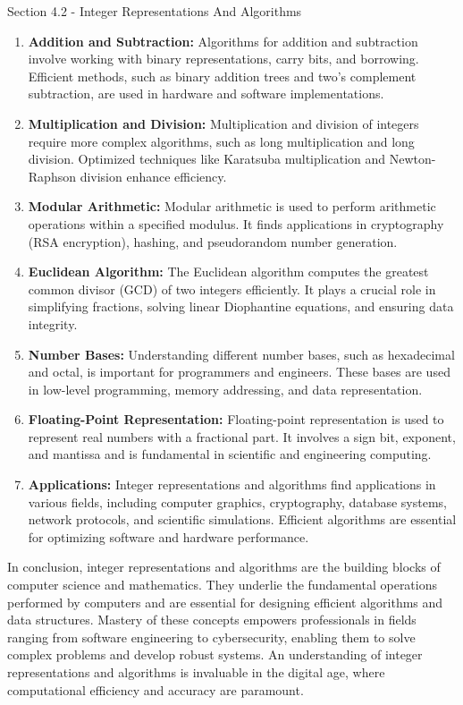 \begin{notes}{Section 4.2 - Integer Representations And Algorithms}
\begin{enumerate}[label=\arabic*.]
        \item \textbf{Addition and Subtraction:} Algorithms for addition and subtraction involve working with binary representations, carry bits, and borrowing. Efficient methods, such as binary addition 
        trees and two's complement subtraction, are used in hardware and software implementations.
        
        \item \textbf{Multiplication and Division:} Multiplication and division of integers require more complex algorithms, such as long multiplication and long division. Optimized techniques like 
        Karatsuba multiplication and Newton-Raphson division enhance efficiency.
        
        \item \textbf{Modular Arithmetic:} Modular arithmetic is used to perform arithmetic operations within a specified modulus. It finds applications in cryptography (RSA encryption), hashing, and 
        pseudorandom number generation.
        
        \item \textbf{Euclidean Algorithm:} The Euclidean algorithm computes the greatest common divisor (GCD) of two integers efficiently. It plays a crucial role in simplifying fractions, solving linear 
        Diophantine equations, and ensuring data integrity.
        
        \item \textbf{Number Bases:} Understanding different number bases, such as hexadecimal and octal, is important for programmers and engineers. These bases are used in low-level programming, memory 
        addressing, and data representation.
        
        \item \textbf{Floating-Point Representation:} Floating-point representation is used to represent real numbers with a fractional part. It involves a sign bit, exponent, and mantissa and is 
        fundamental in scientific and engineering computing.
        
        \item \textbf{Applications:} Integer representations and algorithms find applications in various fields, including computer graphics, cryptography, database systems, network protocols, and 
        scientific simulations. Efficient algorithms are essential for optimizing software and hardware performance.
    \end{enumerate}

    In conclusion, integer representations and algorithms are the building blocks of computer science and mathematics. They underlie the fundamental operations performed by computers and are essential for 
    designing efficient algorithms and data structures. Mastery of these concepts empowers professionals in fields ranging from software engineering to cybersecurity, enabling them to solve complex problems 
    and develop robust systems. An understanding of integer representations and algorithms is invaluable in the digital age, where computational efficiency and accuracy are paramount.
\end{notes}

